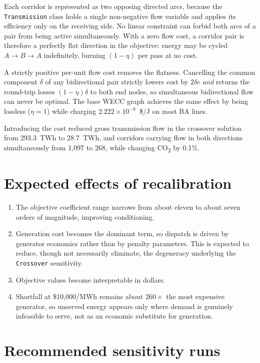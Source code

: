 \documentclass[11pt,a4paper]{article}
\newcommand{\COtwo}{CO\textsubscript{2}}
\begin{document}
Each corridor is represented as two opposing directed arcs, because the
\texttt{Transmission} class holds a single non-negative flow variable and
applies its efficiency only on the receiving side. No linear constraint can
forbid both arcs of a pair from being active simultaneously. With a zero flow
cost, a corridor pair is therefore a perfectly flat direction in the objective:
energy may be cycled $A \rightarrow B \rightarrow A$ indefinitely, burning
$(1-\eta)$ per pass at no cost.

A strictly positive per-unit flow cost removes the flatness. Cancelling the
common component $\delta$ of any bidirectional pair strictly lowers cost by
$2\delta c$ \emph{and} returns the round-trip losses $(1-\eta)\delta$ to both
end nodes, so simultaneous bidirectional flow can never be optimal. The base
WECC graph achieves the same effect by being lossless ($\eta = 1$) while
charging $2.222\times10^{-9}$~\$/J on most BA lines.

Introducing the cost reduced gross transmission flow in the crossover solution
from 293.3~TWh to 28.7~TWh, and corridors carrying flow in both directions
simultaneously from 1{,}097 to 268, while changing \COtwo{} by 0.1\%.

\section{Expected effects of recalibration}

\begin{enumerate}[leftmargin=*]
  \item The objective coefficient range narrows from about eleven to about
        seven orders of magnitude, improving conditioning.
  \item Generation cost becomes the dominant term, so dispatch is driven by
        generator economics rather than by penalty parameters. This is expected
        to reduce, though not necessarily eliminate, the degeneracy underlying
        the \texttt{Crossover} sensitivity.
  \item Objective values become interpretable in dollars.
  \item Shortfall at \$10{,}000/MWh remains about $260\times$ the most
        expensive generator, so unserved energy appears only where demand is
        genuinely infeasible to serve, not as an economic substitute for
        generation.
\end{enumerate}

\section{Recommended sensitivity runs}
\end{document}
